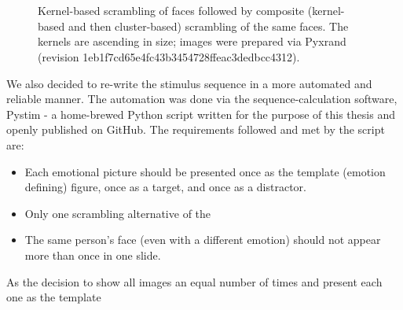 	    \begin{figure}
    		\begin{subfigure}[b]{0.495\textwidth}
		    \centering{}
		    \label{fig:m_vs_pe_1_a}
		\end{subfigure}
		~%
		\begin{subfigure}[b]{0.495\textwidth}
		    \centering{}
		    \label{fig:m_vs_pe_1_b}
		\end{subfigure}
		
		\vspace{0.5cm}%
		\begin{subfigure}[b]{0.495\textwidth}
		    \centering{}
		    \label{fig:m_vs_pe_1_c}
		\end{subfigure}
		~%
		\begin{subfigure}[b]{0.495\textwidth}
		    \centering{}
		    \label{fig:m_vs_pe_1_d}
		\end{subfigure}
		\caption{Kernel-based scrambling of faces followed by composite (kernel-based and then cluster-based) scrambling of the same faces. 
		The kernels are ascending in size; images were prepared via Pyxrand\cite{pyxrand} (revision \textcolor{lg}{1eb1f7cd65e4fc43b3454728ffeac3dedbcc4312}).}
		\label{fig:m_vs_pe_1}
	    \end{figure}

	    We also decided to re-write the stimulus sequence in a more automated and reliable manner.
	    The automation was done via the sequence-calculation software, Pystim\cite{pystim} - a home-brewed Python script written for the purpose of this thesis and openly published on GitHub.
	    The requirements followed and met by the script are:
	    \begin{itemize}
		\item Each emotional picture should be presented once as the template (emotion defining) figure, once as a target, and once as a distractor.
		\item Only one scrambling alternative of the 
		\item The same person's face (even with a different emotion) should not appear more than once in one slide.
	    \end{itemize}
	    As the decision to show all images an equal number of times and present each one as the template
